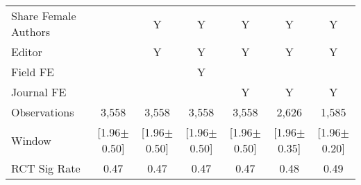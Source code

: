 \begin{tabular}{l*{6}{c}}
Share Female Authors &         &        Y&        Y&        Y&        Y&        Y\\
Editor          &         &        Y&        Y&        Y&        Y&        Y\\
Field FE        &         &         &        Y&         &         &         \\
Journal FE      &         &         &         &        Y&        Y&        Y\\
\hline
Observations    &    3,558&    3,558&    3,558&    3,558&    2,626&    1,585\\
Window          &[1.96$\pm$0.50]&[1.96$\pm$0.50]&[1.96$\pm$0.50]&[1.96$\pm$0.50]&[1.96$\pm$0.35]&[1.96$\pm$0.20]\\
RCT Sig Rate    &    0.47&    0.47&    0.47&    0.47&    0.48&    0.49\\
\hline\hline
\end{tabular}
